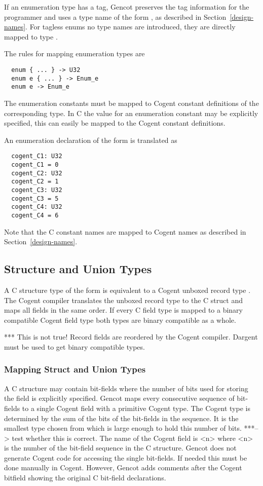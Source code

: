 If an enumeration type has a tag, Gencot preserves the tag information for the programmer and uses
a type name of the form , as described in Section~\ref{design-names}. For tagless enums
no type names are introduced, they are directly mapped to type .

The rules for mapping enumeration types are
\begin{verbatim}
  enum { ... } -> U32
  enum e { ... } -> Enum_e
  enum e -> Enum_e
\end{verbatim}

The enumeration constants must be mapped to Cogent constant definitions of the corresponding type. In 
C the value for an enumeration constant may be explicitly specified, this can easily be mapped to
the Cogent constant definitions.

An enumeration declaration of the form  is translated as
\begin{verbatim}
  cogent_C1: U32
  cogent_C1 = 0
  cogent_C2: U32
  cogent_C2 = 1
  cogent_C3: U32
  cogent_C3 = 5
  cogent_C4: U32
  cogent_C4 = 6
\end{verbatim}
Note that the C constant names are mapped to Cogent names as described in Section~\ref{design-names}.

\subsection{Structure and Union Types}
\label{design-types-struct}

A C structure type of the form  is equivalent to a Cogent unboxed record type .
The Cogent compiler translates the unboxed record type to the C struct and maps all fields in the same order.
If every C field type is mapped to a binary compatible Cogent field type both types are binary compatible as a whole.

*** This is not true! Record fields are reordered by the Cogent compiler. Dargent must be used to get binary compatible types.

\subsubsection{Mapping Struct and Union Types}
A C structure may contain bit-fields where the number of bits used for storing the field is explicitly specified.
Gencot maps every consecutive sequence of bit-fields to a single Cogent field with a primitive Cogent type.
The Cogent type is determined by the sum of the bits of the bit-fields in the sequence. It is the smallest 
type chosen from  which is large enough to hold this number of bits. 
***--> test whether this is correct.
The name of the
Cogent field is <n> where <n> is the number of the bit-field sequence in the C structure.
Gencot does not generate Cogent code for accessing the single bit-fields. If needed this must be done manually in Cogent.
However, Gencot adds comments after the Cogent bitfield showing the original C bit-field declarations.

